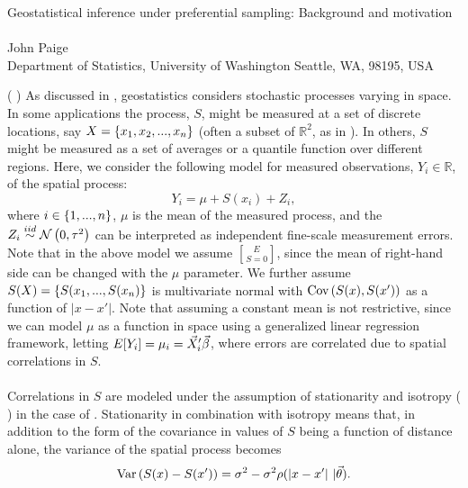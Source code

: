\documentclass{uwstat572}
\newcommand{\vmcomment}[1]{({\color{blue}{VM's comment:}} \textbf{\color{blue}{#1}})}
\begin{document}

\begin{center}
  {\LARGE Geostatistical inference under preferential sampling: Background and motivation}\\\ \\
  {John Paige \\ 
    Department of Statistics, University of Washington Seattle, WA, 98195, USA
  }
\end{center}

\vmcomment{I would try to keep introduction as free from formulae as possible. Try to explain math in words.}
As discussed in \citet{diggle2010}, geostatistics considers stochastic processes varying in space.  In some applications the process, $S$, might be measured at a set of discrete locations, say $X = \left\{x_1, x_2, ..., x_n\right\}$ (often a subset of $\mathbb{R}^2$, as in \citet{diggle2010}).  In others, $S$ might be measured as a set of averages or a quantile function over different regions.  Here, we consider the following model for measured observations, $Y_i \in \mathbb{R}$, of the spatial process:
\begin{equation}
Y_i = \mu + S(x_i) + Z_i,
\label{model}
\end{equation}
where $i \in \left\{1, ..., n\right\}$, $\mu$ is the mean of the measured process, and the $Z_i \stackrel{iid}{\sim} \mathcal{N} \left( 0, \tau^2 \right)$ can be interpreted as independent fine-scale measurement errors.  Note that in the above model we assume $E\brack{S} = 0$, since the mean of right-hand side can be changed with the $\mu$ parameter.  We further assume $S(X) = \left\{S(x_1, ..., S(x_n)\right\}$ is multivariate normal with $\text{Cov}\left(S(x), S(x')\right)$ as a function of $|x - x'|$.  Note that assuming a constant mean is not restrictive, since we can model $\mu$ as a function in space using a generalized linear regression framework, letting $E[Y_i] = \mu_i = \vec{X}_i' \vec{\beta}$, where errors are correlated due to spatial correlations in $S$.
\\\\
Correlations in $S$ are modeled under the assumption of stationarity and isotropy \vmcomment{stationary and isotropy are not defined} in the case of \citet{diggle2010}.  Stationarity in combination with isotropy means that, in addition to the form of the covariance in values of $S$ being a function of distance alone, the variance of the spatial process becomes
\begin{equation}
\text{Var}\left(S(x) - S(x')\right) = \sigma^2 - \sigma^2 \rho(|x - x'| \ \vert \vec{\theta}).
\label{variogram}
\end{equation}
\end{document}
